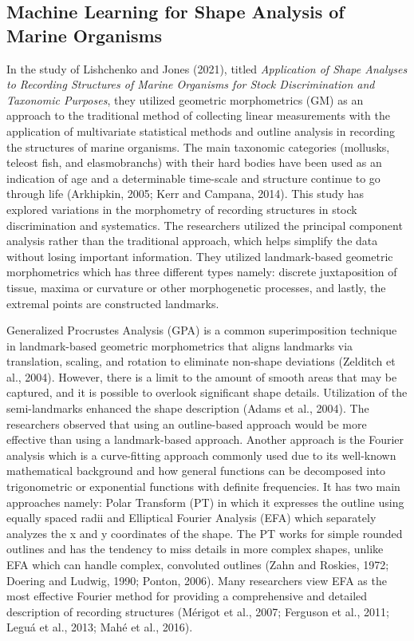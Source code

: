 \subsection{Machine Learning for Shape Analysis of Marine Organisms}
In the study of Lishchenko and Jones (2021), titled \textit{Application of Shape Analyses to Recording Structures of Marine Organisms for Stock Discrimination and Taxonomic Purposes}, they utilized geometric morphometrics (GM) as an approach to the traditional method of collecting linear measurements with the application of multivariate statistical methods and outline analysis in recording the structures of marine organisms. The main taxonomic categories (mollusks, teleost fish, and elasmobranchs) with their hard bodies have been used as an indication of age and a determinable time-scale and structure continue to go through life (Arkhipkin, 2005; Kerr and Campana, 2014). This study has explored variations in the morphometry of recording structures in stock discrimination and systematics. The researchers utilized the principal component analysis rather than the traditional approach, which helps simplify the data without losing important information. They utilized landmark-based geometric morphometrics which has three different types namely: discrete juxtaposition of tissue, maxima or curvature or other morphogenetic processes, and lastly, the extremal points are constructed landmarks.

Generalized Procrustes Analysis (GPA) is a common superimposition technique in landmark-based geometric morphometrics that aligns landmarks via translation, scaling, and rotation to eliminate non-shape deviations (Zelditch et al., 2004). However, there is a limit to the amount of smooth areas that may be captured, and it is possible to overlook significant shape details. Utilization of the semi-landmarks enhanced the shape description (Adams et al., 2004). The researchers observed that using an outline-based approach would be more effective than using a landmark-based approach.
Another approach is the Fourier analysis which is a curve-fitting approach commonly used due to its well-known mathematical background and how general functions can be decomposed into trigonometric or exponential functions with definite frequencies. It has two main approaches namely: Polar Transform (PT) in which it expresses the outline using equally spaced radii and Elliptical Fourier Analysis (EFA) which separately analyzes the x and y coordinates of the shape. The PT works for simple rounded outlines and has the tendency to miss details in more complex shapes, unlike EFA which can handle complex, convoluted outlines (Zahn and Roskies, 1972; Doering and Ludwig, 1990; Ponton, 2006). Many researchers view EFA as the most effective Fourier method for providing a comprehensive and detailed description of recording structures (Mérigot et al., 2007; Ferguson et al., 2011; Leguá et al., 2013; Mahé et al., 2016).


